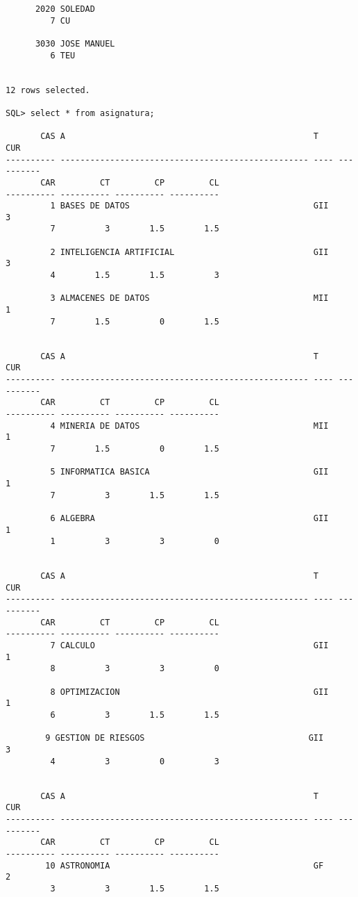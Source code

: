 \documentclass[11pt]{report}
\begin{document}
\begin{verbatim}
      2020 SOLEDAD
         7 CU

      3030 JOSE MANUEL
         6 TEU


12 rows selected.

SQL> select * from asignatura;

       CAS A                                                  T           CUR
---------- -------------------------------------------------- ---- ----------
       CAR         CT         CP         CL
---------- ---------- ---------- ----------
         1 BASES DE DATOS                                     GII           3
         7          3        1.5        1.5

         2 INTELIGENCIA ARTIFICIAL                            GII           3
         4        1.5        1.5          3

         3 ALMACENES DE DATOS                                 MII           1
         7        1.5          0        1.5


       CAS A                                                  T           CUR
---------- -------------------------------------------------- ---- ----------
       CAR         CT         CP         CL
---------- ---------- ---------- ----------
         4 MINERIA DE DATOS                                   MII           1
         7        1.5          0        1.5

         5 INFORMATICA BASICA                                 GII           1
         7          3        1.5        1.5

         6 ALGEBRA                                            GII           1
         1          3          3          0 


       CAS A                                                  T           CUR
---------- -------------------------------------------------- ---- ----------
       CAR         CT         CP         CL
---------- ---------- ---------- ----------
         7 CALCULO                                            GII           1
         8          3          3          0 

         8 OPTIMIZACION                                       GII           1
         6          3        1.5        1.5

        9 GESTION DE RIESGOS                                 GII           3
         4          3          0          3


       CAS A                                                  T           CUR
---------- -------------------------------------------------- ---- ----------
       CAR         CT         CP         CL
---------- ---------- ---------- ----------
        10 ASTRONOMIA                                         GF            2
         3          3        1.5        1.5


\end{verbatim}
\end{document}
